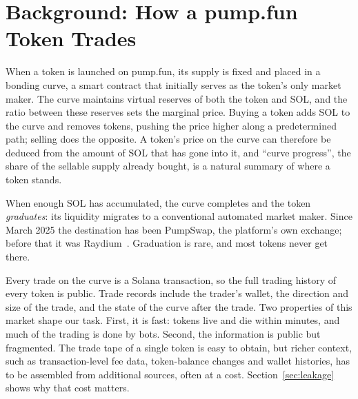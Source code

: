 \section{Background: How a pump.fun Token Trades}
\label{sec:background}

When a token is launched on pump.fun, its supply is fixed and placed in a bonding curve, a smart contract that initially serves as the token's only market maker. The curve maintains virtual reserves of both the token and SOL, and the ratio between these reserves sets the marginal price. Buying a token adds SOL to the curve and removes tokens, pushing the price higher along a predetermined path; selling does the opposite. A token's price on the curve can therefore be deduced from the amount of SOL that has gone into it, and ``curve progress'', the share of the sellable supply already bought, is a natural summary of where a token stands.

When enough SOL has accumulated, the curve completes and the token \emph{graduates}: its liquidity migrates to a conventional automated market maker. Since March 2025 the destination has been PumpSwap, the platform's own exchange; before that it was Raydium~\citep{theblock2025pumpswap}. Graduation is rare, and most tokens never get there.

Every trade on the curve is a Solana transaction, so the full trading history of every token is public. Trade records include the trader's wallet, the direction and size of the trade, and the state of the curve after the trade. Two properties of this market shape our task. First, it is fast: tokens live and die within minutes, and much of the trading is done by bots. Second, the information is public but fragmented. The trade tape of a single token is easy to obtain, but richer context, such as transaction-level fee data, token-balance changes and wallet histories, has to be assembled from additional sources, often at a cost. Section~\ref{sec:leakage} shows why that cost matters.
